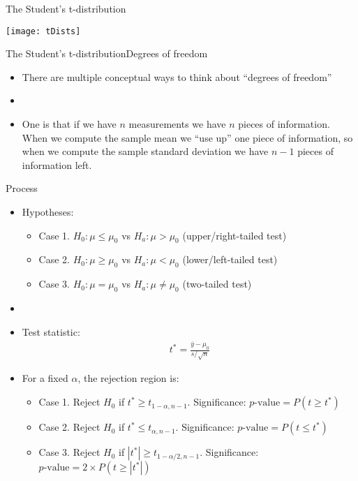 \documentclass[xcolor=dvipsnames]{beamer}
\begin{document}
\begin{frame}{The Student's t-distribution}
	\begin{center}
		\texttt{[image: tDists]}
	\end{center}
\end{frame}

\begin{frame}{The Student's t-distribution}{Degrees of freedom}
	\begin{itemize}
		\item There are multiple conceptual ways to think about ``degrees of freedom''
		\item[]
		\item One is that if we have $n$ measurements we have $n$ pieces of information. When we compute the sample mean we ``use up'' one piece of information, so when we compute the sample standard deviation we have $n-1$ pieces of information left. 
	\end{itemize}
\end{frame}

\begin{frame}{Process}
\begin{itemize}
	\item Hypotheses:
	\begin{itemize}
		\item Case 1. $H_0: \mu \leq \mu_0$ vs $H_a: \mu > \mu_0$ (upper/right-tailed test)
		\item Case 2. $H_0: \mu \geq \mu_0$ vs $H_a: \mu < \mu_0$ (lower/left-tailed test)
		\item Case 3. $H_0: \mu = \mu_0$ vs $H_a: \mu \neq \mu_0$ (two-tailed test)
	\end{itemize}
	\item[]
	\item Test statistic:
	\begin{gather*}
	t^* = \frac{\bar{y} - \mu_0}{s / \sqrt{n}}
	\end{gather*}
	
	\item For a fixed $\alpha$, the rejection region is:
	\begin{itemize}
		\item Case 1. Reject $H_0$ if $t^* \geq t_{1-\alpha, n-1}$. Significance: $p\text{-value}=P(t \geq t^*)$
		\item Case 2. Reject $H_0$ if $t^* \leq t_{\alpha, n-1}$. Significance: $p\text{-value}=P(t \leq t^*)$
		\item Case 3. Reject $H_0$ if $|t^*| \geq t_{1-\alpha / 2, n-1}$. Significance: $p\text{-value}=2 \times P(t \geq |t^*|)$
	\end{itemize}
\end{itemize}
\end{frame}
\end{document}
